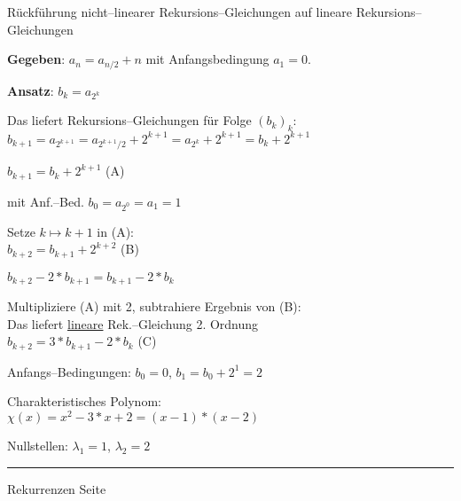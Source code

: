 \begin{slide}{}

\footnotesize
\begin{center}
R\"uckf\"uhrung nicht--linearer Rekursions--Gleichungen auf lineare Rekursions--Gleichungen
\end{center}
\vspace*{0.5cm}

\textbf{Gegeben}: \quad $a_n = a_{n/2} + n$ mit Anfangsbedingung $a_1 = 0$.

\textbf{Ansatz}: \quad $b_k = a_{2^k}$

Das liefert Rekursions--Gleichungen f\"ur Folge $(b_k)_k$: \\[0.3cm]
\hspace*{1.3cm} $b_{k+1} = a_{2^{k+1}} = a_{2^{k+1}/2} + 2^{k+1} = a_{2^{k}} + 2^{k+1} = b_k + 2^{k+1}$ 

\hspace*{1.3cm} $b_{k+1} = b_k + 2^{k+1}$ \hspace*{\fill} (A)

mit Anf.--Bed. $b_0 = a_{2^0} = a_1 = 1$

Setze $k \mapsto k + 1$ in (A): \\[0.3cm]
\hspace*{1.3cm} $b_{k+2} = b_{k+1} + 2^{k+2}$ \hspace*{\fill} (B)

\hspace*{1.3cm} $b_{k+2} - 2 * b_{k+1} = b_{k+1} - 2 * b_k$

Multipliziere (A) mit 2, subtrahiere Ergebnis von (B): \\[0.3cm]

Das liefert \underline{lineare} Rek.--Gleichung 2. Ordnung \\[0.3cm]
\hspace*{1.3cm} $b_{k+2} = 3 * b_{k+1} - 2 * b_k$ \hspace*{\fill} (C)

Anfangs--Bedingungen: $b_0 = 0$, $b_1 = b_0 + 2^1 = 2$

Charakteristisches Polynom: \\[0.3cm]
\hspace*{1.3cm} $\chi(x) = x^2 - 3*x + 2 = (x-1) * (x-2)$

Nullstellen: $\lambda_1 = 1$, $\lambda_2 = 2$

\vspace*{\fill}
\tiny \addtocounter{mypage}{1}
\rule{17cm}{1mm}
Rekurrenzen  \hspace*{\fill} Seite 
\end{slide}

